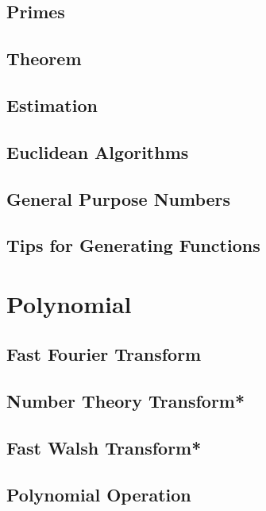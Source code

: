 \subsection{Primes}

\subsection{Theorem}

\subsection{Estimation}

\subsection{Euclidean Algorithms}

\subsection{General Purpose Numbers}

\subsection{Tips for Generating Functions}


\section{Polynomial}
\subsection{Fast Fourier Transform}

\subsection{Number Theory Transform*} %

\subsection{Fast Walsh Transform*} %

\subsection{Polynomial Operation}

